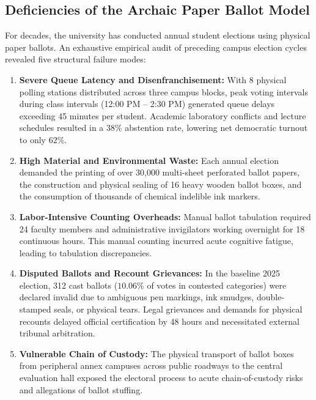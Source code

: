 \documentclass[12pt,a4paper,oneside]{report}
\begin{document}
\subsection{Deficiencies of the Archaic Paper Ballot Model}
For decades, the university has conducted annual student elections using physical paper ballots. An exhaustive empirical audit of preceding campus election cycles revealed five structural failure modes:
\begin{enumerate}
    \item \textbf{Severe Queue Latency and Disenfranchisement:} With 8 physical polling stations distributed across three campus blocks, peak voting intervals during class intervals (12:00 PM -- 2:30 PM) generated queue delays exceeding 45 minutes per student. Academic laboratory conflicts and lecture schedules resulted in a $38\%$ abstention rate, lowering net democratic turnout to only $62\%$.
    \item \textbf{High Material and Environmental Waste:} Each annual election demanded the printing of over 30,000 multi-sheet perforated ballot papers, the construction and physical sealing of 16 heavy wooden ballot boxes, and the consumption of thousands of chemical indelible ink markers.
    \item \textbf{Labor-Intensive Counting Overheads:} Manual ballot tabulation required 24 faculty members and administrative invigilators working overnight for 18 continuous hours. This manual counting incurred acute cognitive fatigue, leading to tabulation discrepancies.
    \item \textbf{Disputed Ballots and Recount Grievances:} In the baseline 2025 election, 312 cast ballots ($10.06\%$ of votes in contested categories) were declared invalid due to ambiguous pen markings, ink smudges, double-stamped seals, or physical tears. Legal grievances and demands for physical recounts delayed official certification by 48 hours and necessitated external tribunal arbitration.
    \item \textbf{Vulnerable Chain of Custody:} The physical transport of ballot boxes from peripheral annex campuses across public roadways to the central evaluation hall exposed the electoral process to acute chain-of-custody risks and allegations of ballot stuffing.
\end{enumerate}
\end{document}
